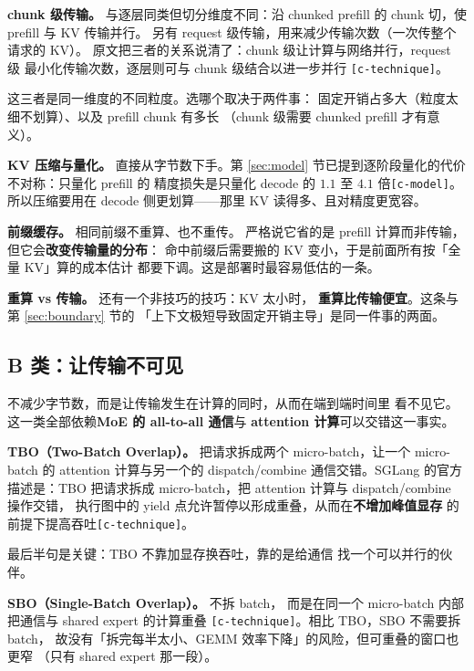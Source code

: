 \noindent\textbf{chunk 级传输。} 与逐层同类但切分维度不同：沿
chunked prefill 的 chunk 切，使 prefill 与 KV 传输并行。
另有 request 级传输，用来减少传输次数（一次传整个请求的 KV）。
原文把三者的关系说清了：chunk 级让计算与网络并行，request 级
最小化传输次数，逐层则可与 chunk 级结合以进一步并行
\texttt{[c-technique]}。

\noindent 这三者是同一维度的不同粒度。选哪个取决于两件事：
固定开销占多大（粒度太细不划算）、以及 prefill chunk 有多长
（chunk 级需要 chunked prefill 才有意义）。

\noindent\textbf{KV 压缩与量化。} 直接从字节数下手。第
\ref{sec:model} 节已提到逐阶段量化的代价不对称：只量化 prefill 的
精度损失是只量化 decode 的 $1.1$ 至 $4.1$ 倍\texttt{[c-model]}。
所以压缩要用在 decode 侧更划算——那里 KV 读得多、且对精度更宽容。

\noindent\textbf{前缀缓存。} 相同前缀不重算、也不重传。
严格说它省的是 prefill 计算而非传输，但它会\textbf{改变传输量的分布}：
命中前缀后需要搬的 KV 变小，于是前面所有按「全量 KV」算的成本估计
都要下调。这是部署时最容易低估的一条。

\noindent\textbf{重算 vs 传输。} 还有一个非技巧的技巧：KV 太小时，
\textbf{重算比传输便宜}。这条与第 \ref{sec:boundary} 节的
「上下文极短导致固定开销主导」是同一件事的两面。

\subsection{B 类：让传输不可见}

不减少字节数，而是让传输发生在计算的同时，从而在端到端时间里
看不见它。这一类全部依赖\textbf{MoE 的 all-to-all 通信}与
\textbf{attention 计算}可以交错这一事实。

\noindent\textbf{TBO（Two-Batch Overlap）。} 把请求拆成两个
micro-batch，让一个 micro-batch 的 attention 计算与另一个的
dispatch/combine 通信交错。SGLang 的官方描述是：TBO 把请求拆成
micro-batch，把 attention 计算与 dispatch/combine 操作交错，
执行图中的 yield 点允许暂停以形成重叠，从而在\textbf{不增加峰值显存}
的前提下提高吞吐\texttt{[c-technique]}。

\noindent 最后半句是关键：TBO 不靠加显存换吞吐，靠的是给通信
找一个可以并行的伙伴。

\noindent\textbf{SBO（Single-Batch Overlap）。} 不拆 batch，
而是在同一个 micro-batch 内部把通信与 shared expert 的计算重叠
\texttt{[c-technique]}。相比 TBO，SBO 不需要拆 batch，
故没有「拆完每半太小、GEMM 效率下降」的风险，但可重叠的窗口也更窄
（只有 shared expert 那一段）。

